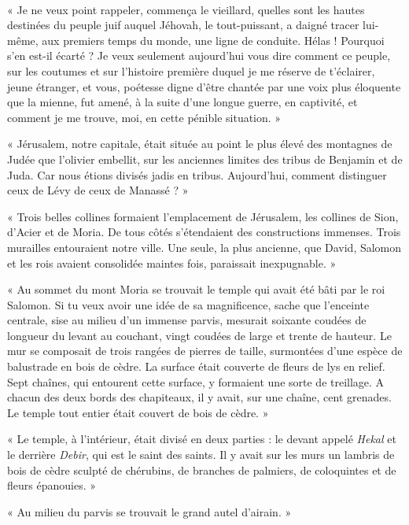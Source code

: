 \documentclass[a4paper, 11pt, oneside, polutonikogreek, french]{article}
\begin{document}
\paragraph{}
« Je ne veux point rappeler, commença le vieillard, quelles sont les hautes destinées du peuple juif auquel Jéhovah, le tout-puissant, a daigné tracer lui-même, aux premiers temps du monde, une ligne de conduite. Hélas ! Pourquoi s'en est-il écarté ? Je veux seulement aujourd'hui vous dire comment ce peuple, sur les coutumes et sur l'histoire première duquel je me réserve de t'éclairer, jeune étranger, et vous, poétesse digne d'être chantée par une voix plus éloquente que la mienne, fut amené, à la suite d'une longue guerre, en captivité, et comment je me trouve, moi, en cette pénible situation. »

« Jérusalem, notre capitale, était située au point le plus élevé des montagnes de Judée que l'olivier embellit, sur les anciennes limites des tribus de Benjamin et de Juda. Car nous étions divisés jadis en tribus. Aujourd'hui, comment distinguer ceux de Lévy de ceux de Manassé ? »

« Trois belles collines formaient l'emplacement de Jérusalem, les collines de Sion, d'Acier et de Moria. De tous côtés s'étendaient des constructions immenses. Trois murailles entouraient notre ville. Une seule, la plus ancienne, que David, Salomon et les rois avaient consolidée maintes fois, paraissait inexpugnable. »

« Au sommet du mont Moria se trouvait le temple qui avait été bâti par le roi Salomon. Si tu veux avoir une idée de sa magnificence, sache que l'enceinte centrale, sise au milieu d'un immense parvis, mesurait soixante coudées de longueur du levant au couchant, vingt coudées de large et trente de hauteur. Le mur se composait de trois rangées de pierres de taille, surmontées d'une espèce de balustrade en bois de cèdre. La surface était couverte de fleurs de lys en relief. Sept chaînes, qui entourent cette surface, y formaient une sorte de treillage. A chacun des deux bords des chapiteaux, il y avait, sur une chaîne, cent grenades. Le temple tout entier était couvert de bois de cèdre. »

« Le temple, à l'intérieur, était divisé en deux parties : le devant appelé \emph{Hekal} et le derrière \emph{Debir}, qui est le saint des saints. Il y avait sur les murs un lambris de bois de cèdre sculpté de chérubins, de branches de palmiers, de coloquintes et de fleurs épanouies. »

« Au milieu du parvis se trouvait le grand autel d'airain. »
\end{document}
